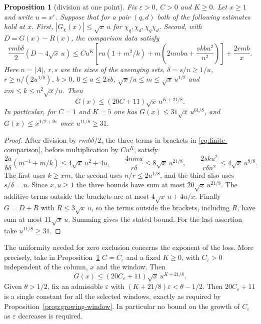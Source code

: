 \documentclass[10pt]{amsart}
\newtheorem{proposition}[theorem]{Proposition}
\theoremstyle{definition}
\theoremstyle{remark}
\begin{document}
\begin{proposition}[division at one point]\label{prop:finite-to-window}
Fix $\varepsilon>0$, $C>0$ and $K\ge0$. Let $x\ge1$ and write
$u=x^\varepsilon$. Suppose that for a pair $(q,d)$ both of the following
estimates hold at $x$. First, $|G_\chi(x)|\le\sqrt{x}\,u$
for $\chi_q,\chi_d,\chi_q\chi_d$. Second, with
$D=G(x)-R(x)$, the comparison data satisfy
\begin{equation}\label{eq:finite-comparison}
 \frac{rmb\delta}{2}(D-4\sqrt{x}\,u)
 \le Cu^K\left[ra(1+m^2/k)
      +m\left(2nmbu+\frac{skbu^2}{n^2}\right)\right]
      +\frac{2rmb}{x}.
\end{equation}
Here $n=|A|$, $r,s$ are the sizes of the averaging sets,
$\delta=s/n\ge1/u$, $r\ge n/(2u^{1/8})$, $b>0$, $0\le a\le2xb$,
$\sqrt{x}/u\le m\le\sqrt{x}\,u^{1/2}$ and
$xm\le k\le n^2\sqrt{x}/u$.
Then
\[
 G(x)\le (20C+11)\sqrt{x}\,u^{K+21/8}.
\]
In particular, for $C=1$ and $K=5$ one has $G(x)\le 31\sqrt{x}\,u^{61/8}$,
and $G(x)\le x^{1/2+9\varepsilon}$ once $u^{11/8}\ge31$.
\end{proposition}
\begin{proof}
After division by $rmb\delta/2$, the three terms in brackets in
\eqref{eq:finite-comparison}, before multiplication by $Cu^K$, satisfy
\[
 \frac{2a}{b\delta}(m^{-1}+m/k)\le4\sqrt{x}\,u^2+4u,\qquad
 \frac{4nmu}{r\delta}\le8\sqrt{x}\,u^{21/8},\qquad
 \frac{2sku^2}{r\delta n^2}\le4\sqrt{x}\,u^{9/8}.
\]
The first uses $k\ge xm$, the second uses $n/r\le2u^{1/8}$,
and the third also uses $s/\delta=n$. Since $x,u\ge1$ the three bounds have
sum at most $20\sqrt{x}\,u^{21/8}$. The additive terms outside
the brackets are at most $4\sqrt{x}\,u+4u/x$.
Finally $G=D+R$ with $R\le3\sqrt{x}\,u$, so the terms outside the brackets,
including $R$, have sum at most $11\sqrt{x}\,u$. Summing gives the stated
bound. For the last assertion take $u^{11/8}\ge31$.
\end{proof}

The uniformity needed for zero exclusion concerns the exponent
of the loss. More precisely, take in Proposition~\ref{prop:finite-to-window}
$C=C_\varepsilon$ and a fixed $K\ge0$, with $C_\varepsilon>0$ independent
of the column, $x$ and the window. Then
\[
 G(x)\le (20C_\varepsilon+11)\sqrt{x}\,u^{K+21/8}.
\]
Given $\theta>1/2$, fix an admissible $\varepsilon$ with
$(K+21/8)\varepsilon<\theta-1/2$. Then $20C_\varepsilon+11$
is a single constant for all the selected windows, exactly as
required by Proposition~\ref{prop:growing-window}. In particular
no bound on the growth of $C_\varepsilon$ as $\varepsilon$
decreases is required.
\end{document}

